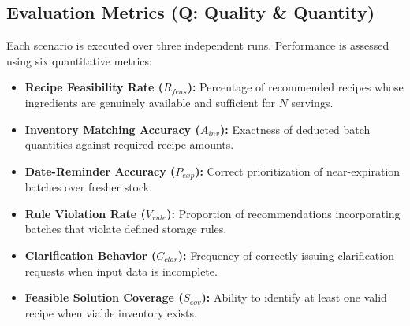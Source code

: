 \subsection{Evaluation Metrics (Q: Quality \& Quantity)}
Each scenario is executed over three independent runs. Performance is assessed using six quantitative metrics:
\begin{itemize}
    \item \textbf{Recipe Feasibility Rate ($R_{feas}$):} Percentage of recommended recipes whose ingredients are genuinely available and sufficient for $N$ servings.
    \item \textbf{Inventory Matching Accuracy ($A_{inv}$):} Exactness of deducted batch quantities against required recipe amounts.
    \item \textbf{Date-Reminder Accuracy ($P_{exp}$):} Correct prioritization of near-expiration batches over fresher stock.
    \item \textbf{Rule Violation Rate ($V_{rule}$):} Proportion of recommendations incorporating batches that violate defined storage rules.
    \item \textbf{Clarification Behavior ($C_{clar}$):} Frequency of correctly issuing clarification requests when input data is incomplete.
    \item \textbf{Feasible Solution Coverage ($S_{cov}$):} Ability to identify at least one valid recipe when viable inventory exists.
\end{itemize}
